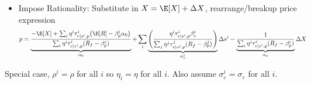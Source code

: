 \documentclass[12pt]{article}
\theoremstyle{plain}
\theoremstyle{definition}
\theoremstyle{remark}
\begin{document}
\begin{itemize}
  \item
    Impose Rationality:
    Substitute in $X=\E[X]+\Delta X$, rearrange/breakup price expression
    \begin{align*}
      p
      &=
      \underbrace{%
        \frac{%
          -\E[X]
          +
          \sum_i
          \eta^i \tau^i_{v|s^i,p}
          \big(
            \E[R]
            - \beta_p^i \alpha_0
          \big)
        }{%
          \sum_i
          \eta^i \tau^i_{v|s^i,p}
          (R_f-\beta_p^i)
        }
      }_{\alpha_0}
      +
      \sum_i
      \underbrace{%
        \left(
        \frac{%
          \eta^i \tau^i_{v|s^i,p}
          \beta_s^i
        }{%
          \sum_j
          \eta^j \tau^j_{v|s^j,p}
          (R_f-\beta_p^j)
        }
        \right)
      }_{\alpha_s^i}
      \Delta s^i
      -
      \underbrace{%
        \frac{%
          1
        }{%
          \sum_i
          \eta^i \tau^i_{v|s^i,p}
          (R_f-\beta_p^i)
        }
      }_{\alpha_x}
      \Delta X
    \end{align*}
\end{itemize}
Special case, $\rho^i=\rho$ for all $i$ so $\eta_i=\eta$ for all $i$.
Also assume $\sigma_\varepsilon^i=\sigma_\varepsilon$ for all $i$.
\end{document}
